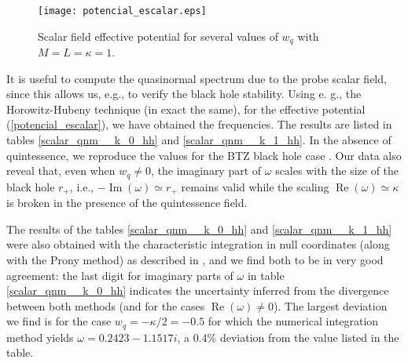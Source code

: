 \documentclass[preprint]{revtex4-1}
\renewcommand{\Re}{\operatorname{Re}}
\renewcommand{\Im}{\operatorname{Im}}
\begin{document}
\begin{figure}[htp!]
\centering
\texttt{[image: potencial\_escalar.eps]}
\caption{Scalar field effective potential for several values of $w_{q}$ with $M=L=\kappa=1$.}
\label{pot_escalar}
\end{figure}

It is useful to compute the quasinormal spectrum due to the probe scalar field, since this allows us, e.g., to verify the black hole stability. Using e. g., the Horowitz-Hubeny technique \cite{Horowitz:1999jd} (in exact the same), for the effective potential (\ref{potencial_escalar}), we have obtained the frequencies. The results are listed in tables \ref{scalar_qnm__k_0_hh} and \ref{scalar_qnm__k_1_hh}. 
In the absence of quintessence, we reproduce the values for the BTZ black hole case \cite{Cardoso:2001hn}. Our data also reveal that, even when $w_q\neq 0$, the imaginary part of $\omega$ scales with the size of the black hole $r_{+}$, i.e., $-\Im(\omega)\simeq r_{+}$ remains valid while the scaling $\Re(\omega)\simeq \kappa$ is broken in the presence of the quintessence field.

The results of the tables \ref{scalar_qnm__k_0_hh} and \ref{scalar_qnm__k_1_hh} were also obtained with the characteristic integration in null coordinates  (along with the Prony method) as described in \cite{Konoplya:2011qq}, and we find both to be in very good agreement: the last digit for imaginary parts of $\omega$ in table \ref{scalar_qnm__k_0_hh} indicates the uncertainty inferred from the divergence between both methods (and for the cases $\Re(\omega) \neq 0$). The largest deviation we find is for the case $w_q=-\kappa /2=-0.5$ for which the numerical integration method yields $\omega = 0.2423-1.1517i$, a $0.4\%$ deviation from the value listed in the table.
\end{document}
